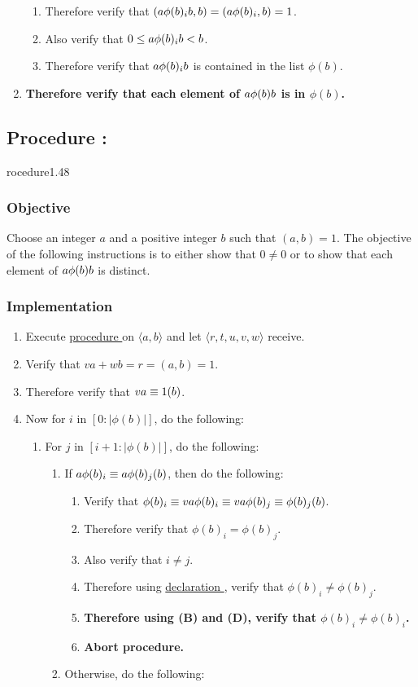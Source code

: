 \documentclass{article}
\let\mod\relax\DeclareMathOperator{\mod}{mod}
\newcounter{declaration}[part]
\newcommand{\declarationhr}[1]{\hyperref[sec:declaration #1]{declaration \expandafter\csname declaration#1\endcsname}}
\newcounter{procedure}[part]
\newcommand{\procedure}[1]{\subsection*{Procedure \thepart:\theprocedure}\label{sec:procedure #1}\global\expandafter\edef\csname procedure#1\endcsname{\thepart:\theprocedure}\addtocounter{procedure}{1}}
\newcommand{\objective}{\subsubsection*{Objective}}
\newcommand{\implementation}{\subsubsection*{Implementation}}
\newcommand{\procedurehr}[1]{\hyperref[sec:procedure #1]{procedure \expandafter\csname procedure#1\endcsname}}
\begin{document}
\begin{multicols}{2}
\begin{enumerate}
\begin{enumerate}
						\item Therefore verify that $(a\phi(b)_i\mod b,b)=(a\phi(b)_i,b)=1$.
						\item Also verify that $0\le a\phi(b)_i\mod b<b$.
						\item Therefore verify that $a\phi(b)_i\mod b$ is contained in the list $\phi(b)$.
					\end{enumerate}
					\item \textbf{Therefore verify that each element of $a\phi(b)\mod b$ is in $\phi(b)$.}
				\end{enumerate}
		\procedure{1.48}
			\objective
				Choose an integer $a$ and a positive integer $b$ such that $(a,b)=1$. The objective of the following instructions is to either show that $0\ne 0$ or to show that each element of $a\phi(b)\mod b$ is distinct.
			\implementation
				\begin{enumerate}
					\item Execute \procedurehr{1.09} on $\langle a,b\rangle$ and let $\langle r,t,u,v,w\rangle$ receive.
					\item Verify that $va+wb=r=(a,b)=1$.
					\item Therefore verify that $va\equiv 1(\mod b)$.
					\item Now for $i$ in $[0:\lvert\phi(b)\rvert]$, do the following:
					\begin{enumerate}
						\item For $j$ in $[i+1:\lvert\phi(b)\rvert]$, do the following:
						\begin{enumerate}
							\item If $a\phi(b)_i\equiv a\phi(b)_j(\mod b)$, then do the following:
							\begin{enumerate}
								\item Verify that $\phi(b)_i\equiv va\phi(b)_i\equiv va\phi(b)_j\equiv\phi(b)_j(\mod b)$.
								\item Therefore verify that $\phi(b)_i=\phi(b)_j$.
								\item Also verify that $i\ne j$.
								\item Therefore using \declarationhr{1.16}, verify that $\phi(b)_i\ne\phi(b)_j$.
								\item \textbf{Therefore using (B) and (D), verify that $\phi(b)_i\ne\phi(b)_i$.}
								\item \textbf{Abort procedure.}
							\end{enumerate}
							\item Otherwise, do the following:
							\begin{enumerate}

\end{enumerate}
\end{enumerate}
\end{enumerate}
\end{enumerate}
\end{multicols}
\end{document}
